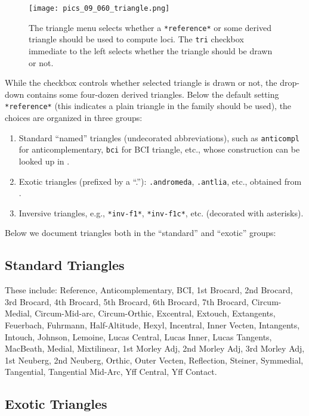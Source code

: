 \begin{figure}
    \centering
    \texttt{[image: pics\_09\_060\_triangle.png]}
    \caption{The triangle menu selects whether a \texttt{*reference*} or some derived triangle should be used to compute loci. The \texttt{tri} checkbox immediate to the left selects whether the triangle should be drawn or not.}
    \label{fig:09-menu-triangle}
\end{figure}

While the checkbox controls whether selected triangle is drawn or not, the drop-down contains some four-dozen derived triangles. Below the default setting \texttt{*reference*} (this indicates a plain triangle in the family should be used), the choices are organized in three groups:

\begin{enumerate}
    \item Standard ``named'' triangles (undecorated abbreviations), such as \texttt{anticompl} for anticomplementary, \texttt{bci} for BCI triangle, etc., whose construction can be looked up in \cite{mw}.
    \item Exotic triangles (prefixed by a ``.''): \texttt{.andromeda}, \texttt{.antlia}, etc., obtained from \cite{lozada2016-triangles}.
    \item Inversive triangles, e.g., \texttt{*inv-f1*}, \texttt{*inv-f1c*}, etc. (decorated with asterisks). 
\end{enumerate}

Below we document triangles both in the ``standard'' and ``exotic'' groups:

\subsection{Standard Triangles}

These include: Reference, Anticomplementary, BCI, 1st Brocard, 2nd Brocard, 3rd Brocard, 4th Brocard, 5th Brocard, 6th Brocard, 7th Brocard, Circum-Medial, Circum-Mid-arc, Circum-Orthic, Excentral, Extouch, Extangents, Feuerbach, Fuhrmann, Half-Altitude, Hexyl, Incentral, Inner Vecten, Intangents, Intouch, Johnson, Lemoine, Lucas Central, Lucas Inner, Lucas Tangents, MacBeath, Medial, Mixtilinear, 1st Morley Adj, 2nd Morley Adj, 3rd Morley Adj, 1st Neuberg, 2nd Neuberg, Orthic, Outer Vecten, Reflection, Steiner, Symmedial, Tangential, Tangential Mid-Arc, Yff Central, Yff Contact.

\subsection{Exotic Triangles}

